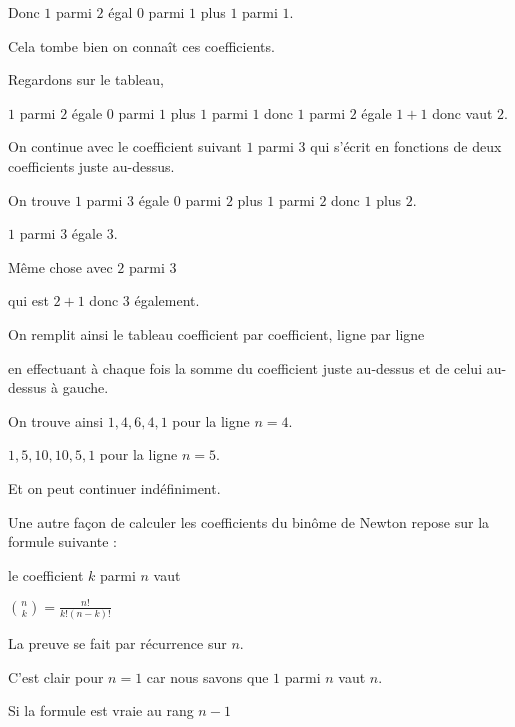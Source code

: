\change

Donc $1$ parmi $2$ égal $0$ parmi $1$ plus $1$ parmi $1$.

Cela tombe bien on connaît ces coefficients.

Regardons sur le tableau, 

$1$ parmi $2$ égale $0$ parmi $1$ plus $1$ parmi $1$
donc $1$ parmi $2$ égale $1+1$ donc vaut $2$.

\change

On continue avec le coefficient suivant $1$ parmi $3$
qui s'écrit en fonctions de deux coefficients juste au-dessus.

\change

On trouve $1$ parmi $3$ égale $0$ parmi $2$ plus $1$ parmi $2$
donc $1$ plus $2$.

$1$ parmi $3$ égale $3$.


\change

Même chose avec $2$ parmi $3$ 

\change

qui est $2+1$ donc $3$ également.

\change

On remplit ainsi le tableau coefficient par coefficient, ligne par ligne

\change

en effectuant à chaque fois la somme du coefficient juste au-dessus et 
de celui au-dessus à gauche.


On trouve ainsi $1, 4, 6, 4, 1$ pour la ligne $n=4$.

\change

$1, 5, 10, 10, 5, 1$ pour la ligne $n=5$.

\change

Et on peut continuer indéfiniment.




\diapo

Une autre façon de calculer les coefficients du binôme de Newton repose sur la formule suivante :

le coefficient $k$ parmi $n$ vaut

$ \binom n k = \frac{n!}{k!(n-k)!}$

\change

La preuve se fait par récurrence sur $n$.

C'est clair pour $n=1$ car nous savons que $1$ parmi $n$ vaut $n$.

\change


Si la formule est vraie au rang $n-1$ 

